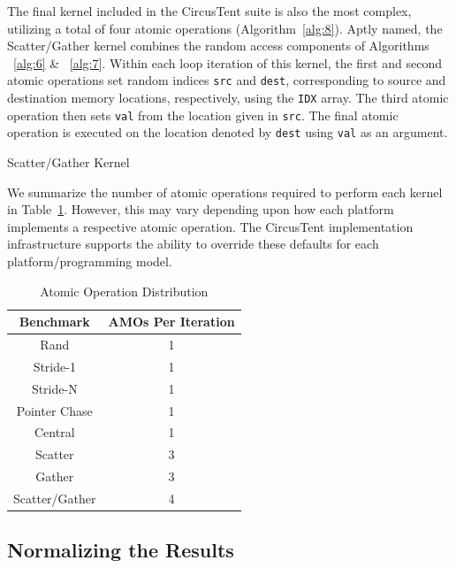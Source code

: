 The final kernel included in the CircusTent suite is also the most complex, utilizing a total of four atomic operations (Algorithm~\ref{alg:8}).
Aptly named, the Scatter/Gather kernel combines the random access components of Algorithms ~\ref{alg:6} \& ~\ref{alg:7}.
Within each loop iteration of this kernel, the first and second atomic operations set random indices \texttt{src} and \texttt{dest}, corresponding to source and destination memory locations, respectively, using the \texttt{IDX} array.
The third atomic operation then sets \texttt{val} from the location given in \texttt{src}.
The final atomic operation is executed on the location denoted by \texttt{dest} using \texttt{val} as an argument.

\begin{algorithm}
\SetAlgoLined
{}
\caption{Scatter/Gather Kernel}
\label{alg:8}
\end{algorithm}

We summarize the number of atomic operations required to perform each kernel in Table~\ref{tab:amodistro}.
However, this may vary depending upon how each platform implements a respective atomic operation.
The CircusTent implementation infrastructure supports the ability to override these defaults for each platform/programming model.    

\begin{table}
  \caption{Atomic Operation Distribution}
  \label{tab:amodistro}
  \begin{tabular}{cc}
    \toprule
    Benchmark&AMOs Per Iteration\\
    \midrule
   Rand & 1\\
   Stride-1 & 1\\
   Stride-N & 1\\
   Pointer Chase & 1\\
   Central & 1\\
   Scatter & 3\\
   Gather & 3\\
   Scatter/Gather & 4\\
  \bottomrule
\end{tabular}
\end{table}

\subsection{Normalizing the Results}
\label{subsec:normalizingtheresults}

